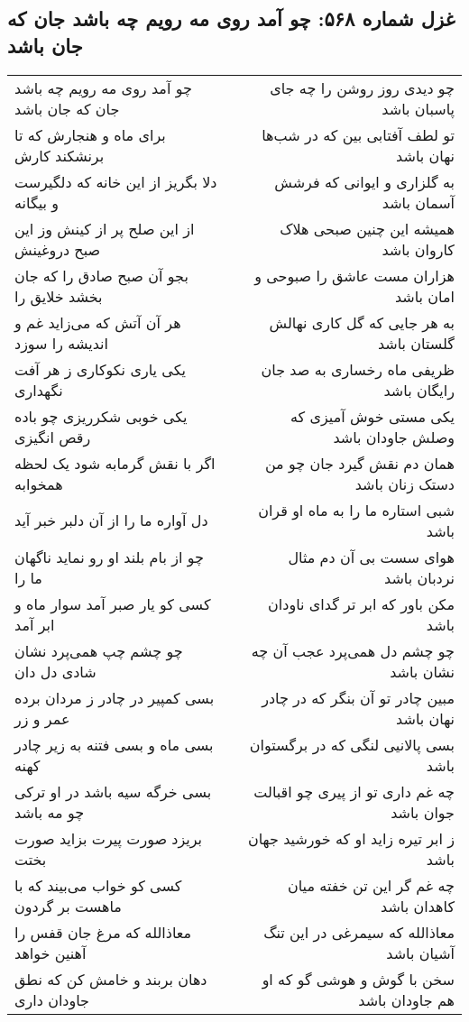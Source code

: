 \begin{center}
\section*{غزل شماره ۵۶۸: چو آمد روی مه رویم چه باشد جان که جان باشد}
\label{sec:0568}
\begin{longtable}{l p{0.5cm} r}
چو آمد روی مه رویم چه باشد جان که جان باشد
&&
چو دیدی روز روشن را چه جای پاسبان باشد
\\
برای ماه و هنجارش که تا برنشکند کارش
&&
تو لطف آفتابی بین که در شب‌ها نهان باشد
\\
دلا بگریز از این خانه که دلگیرست و بیگانه
&&
به گلزاری و ایوانی که فرشش آسمان باشد
\\
از این صلح پر از کینش وز این صبح دروغینش
&&
همیشه این چنین صبحی هلاک کاروان باشد
\\
بجو آن صبح صادق را که جان بخشد خلایق را
&&
هزاران مست عاشق را صبوحی و امان باشد
\\
هر آن آتش که می‌زاید غم و اندیشه را سوزد
&&
به هر جایی که گل کاری نهالش گلستان باشد
\\
یکی یاری نکوکاری ز هر آفت نگهداری
&&
ظریفی ماه رخساری به صد جان رایگان باشد
\\
یکی خوبی شکرریزی چو باده رقص انگیزی
&&
یکی مستی خوش آمیزی که وصلش جاودان باشد
\\
اگر با نقش گرمابه شود یک لحظه همخوابه
&&
همان دم نقش گیرد جان چو من دستک زنان باشد
\\
دل آواره ما را از آن دلبر خبر آید
&&
شبی استاره ما را به ماه او قران باشد
\\
چو از بام بلند او رو نماید ناگهان ما را
&&
هوای سست بی آن دم مثال نردبان باشد
\\
کسی کو یار صبر آمد سوار ماه و ابر آمد
&&
مکن باور که ابر تر گدای ناودان باشد
\\
چو چشم چپ همی‌پرد نشان شادی دل دان
&&
چو چشم دل همی‌پرد عجب آن چه نشان باشد
\\
بسی کمپیر در چادر ز مردان برده عمر و زر
&&
مبین چادر تو آن بنگر که در چادر نهان باشد
\\
بسی ماه و بسی فتنه به زیر چادر کهنه
&&
بسی پالانیی لنگی که در برگستوان باشد
\\
بسی خرگه سیه باشد در او ترکی چو مه باشد
&&
چه غم داری تو از پیری چو اقبالت جوان باشد
\\
بریزد صورت پیرت بزاید صورت بختت
&&
ز ابر تیره زاید او که خورشید جهان باشد
\\
کسی کو خواب می‌بیند که با ماهست بر گردون
&&
چه غم گر این تن خفته میان کاهدان باشد
\\
معاذالله که مرغ جان قفس را آهنین خواهد
&&
معاذالله که سیمرغی در این تنگ آشیان باشد
\\
دهان بربند و خامش کن که نطق جاودان داری
&&
سخن با گوش و هوشی گو که او هم جاودان باشد
\\
\end{longtable}
\end{center}
